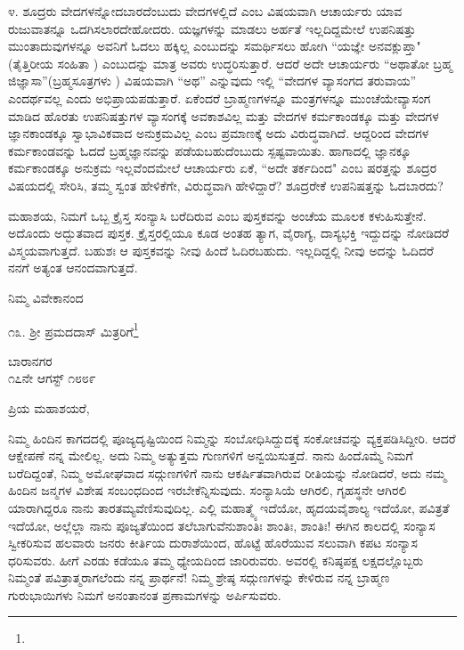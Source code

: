 ೪. ಶೂದ್ರರು ವೇದಗಳನ್ನೋದಬಾರದೆಂಬುದು ವೇದಗಳಲ್ಲಿದೆ ಎಂಬ ವಿಷಯವಾಗಿ ಆಚಾರ್ಯರು ಯಾವ ರುಜುವಾತನ್ನೂ ಒದಗಿಸಲಾರದೇಹೋದರು. ಯಜ್ಞಗಳನ್ನು ಮಾಡಲು ಅರ್ಹತೆ ಇಲ್ಲದಿದ್ದಮೇಲೆ ಉಪನಿಷತ್ತು ಮುಂತಾದುವುಗಳನ್ನೂ ಅವನಿಗೆ ಓದಲು ಹಕ್ಕಿಲ್ಲ ಎಂಬುದನ್ನು ಸಮರ್ಥಿಸಲು ಹೋಗಿ ``ಯಜ್ಞೇ ಅನವಕ್ಲುಪ್ತಾ" (ತೈತ್ತಿರೀಯ ಸಂಹಿತಾ ) ಎಂಬುದನ್ನು ಮಾತ್ರ ಅವರು ಉದ್ಧರಿಸುತ್ತಾರೆ. ಆದರೆ ಅದೇ ಆಚಾರ್ಯರು “ಅಥಾತೋ ಬ್ರಹ್ಮ ಜಿಜ್ಞಾಸಾ”(ಬ್ರಹ್ಮಸೂತ್ರಗಳು ) ವಿಷಯವಾಗಿ “ಅಥ” ಎನ್ನುವುದು ಇಲ್ಲಿ “ವೇದಗಳ ವ್ಯಾಸಂಗದ ತರುವಾಯ” ಎಂದರ್ಥವಲ್ಲ ಎಂದು ಅಭಿಪ್ರಾಯಪಡುತ್ತಾರೆ. ಏಕೆಂದರೆ ಬ್ರಾಹ್ಮಣಗಳನ್ನೂ ಮಂತ್ರಗಳನ್ನೂ ಮುಂಚೆಯೇ\break ವ್ಯಾಸಂಗ ಮಾಡಿದ ಹೊರತು ಉಪನಿಷತ್ತುಗಳ ವ್ಯಾಸಂಗಕ್ಕೆ ಅವಕಾಶವಿಲ್ಲ ಮತ್ತು ವೇದಗಳ ಕರ್ಮಕಾಂಡಕ್ಕೂ ಮತ್ತು ವೇದಗಳ ಜ್ಞಾನಕಾಂಡಕ್ಕೂ ಸ್ವಾಭಾವಿಕವಾದ ಅನುಕ್ರಮವಿಲ್ಲ ಎಂಬ ಪ್ರಮಾಣಕ್ಕೆ ಅದು ವಿರುದ್ಧವಾಗಿದೆ. ಆದ್ದರಿಂದ ವೇದಗಳ ಕರ್ಮಕಾಂಡವನ್ನು ಓದದೆ ಬ್ರಹ್ಮಜ್ಞಾನವನ್ನು ಪಡೆಯಬಹುದೆಂಬುದು ಸ್ಪಷ್ಟವಾಯಿತು. ಹಾಗಾದಲ್ಲಿ ಜ್ಞಾನಕ್ಕೂ ಕರ್ಮಕಾಂಡಕ್ಕೂ ಅನುಕ್ರಮ ಇಲ್ಲವೆಂದಮೇಲೆ ಆಚಾರ್ಯರು ಏಕೆ, “ಅದೇ ತರ್ಕದಿಂದ" ಎಂಬ ಷರತ್ತನ್ನು ಶೂದ್ರರ ವಿಷಯದಲ್ಲಿ ಸೇರಿಸಿ, ತಮ್ಮ ಸ್ವಂತ ಹೇಳಿಕೆಗೇ, ವಿರುದ್ಧವಾಗಿ ಹೇಳಿದ್ದಾರೆ? ಶೂದ್ರರೇಕೆ ಉಪನಿಷತ್ತನ್ನು ಓದಬಾರದು?

ಮಹಾಶಯ, ನಿಮಗೆ ಒಬ್ಬ ಕ್ರೈಸ್ತ ಸಂನ್ಯಾಸಿ ಬರೆದಿರುವ  ಎಂಬ ಪುಸ್ತಕವನ್ನು ಅಂಚೆಯ ಮೂಲಕ ಕಳುಹಿಸುತ್ತೇನೆ. ಅದೊಂದು ಅದ್ಭುತವಾದ ಪುಸ್ತಕ. ಕ್ರೈಸ್ತರಲ್ಲಿಯೂ ಕೂಡ ಅಂತಹ ತ್ಯಾಗ, ವೈರಾಗ್ಯ, ದಾಸ್ಯಭಕ್ತಿ ಇದ್ದುದನ್ನು ನೋಡಿದರೆ ವಿಸ್ಮಯವಾಗುತ್ತದೆ. ಬಹುಶಃ ಆ ಪುಸ್ತಕವನ್ನು ನೀವು ಹಿಂದೆ ಓದಿರಬಹುದು. ಇಲ್ಲದಿದ್ದಲ್ಲಿ ನೀವು ಅದನ್ನು ಓದಿದರೆ ನನಗೆ ಅತ್ಯಂತ ಆನಂದವಾಗುತ್ತದೆ.

{\flushright
ನಿಮ್ಮ ವಿವೇಕಾನಂದ\par}

\vspace{-0.3cm}

\begin{center}
೧೩. ಶ‍್ರೀ ಪ್ರಮದದಾಸ್ ಮಿತ್ರರಿಗೆ\footnote{}
\end{center}

\vspace{-0.7cm}

\begin{flushright}
ಬಾರಾನಗರ\\೧೭ನೇ ಆಗಸ್ಟ್ ೧೮೮೯
\end{flushright}

\noindent
ಪ್ರಿಯ ಮಹಾಶಯರೆ,

ನಿಮ್ಮ ಹಿಂದಿನ ಕಾಗದದಲ್ಲಿ ಪೂಜ್ಯದೃಷ್ಟಿಯಿಂದ ನಿಮ್ಮನ್ನು ಸಂಬೋಧಿಸಿದ್ದುದಕ್ಕೆ ಸಂಕೋಚವನ್ನು ವ್ಯಕ್ತಪಡಿಸಿದ್ದೀರಿ. ಆದರೆ ಆಕ್ಷೇಪಣೆ ನನ್ನ ಮೇಲಿಲ್ಲ. ಅದು ನಿಮ್ಮ ಅತ್ಯುತ್ತಮ ಗುಣಗಳಿಗೆ ಅನ್ವಯಿಸುತ್ತದೆ. ನಾನು ಹಿಂದೊಮ್ಮೆ ನಿಮಗೆ ಬರೆದಿದ್ದಂತೆ, ನಿಮ್ಮ ಅಮೋಘವಾದ ಸದ್ಗುಣಗಳಿಗೆ ನಾನು ಆಕರ್ಷಿತವಾಗಿರುವ ರೀತಿಯನ್ನು ನೋಡಿದರೆ, ಅದು ನಮ್ಮ ಹಿಂದಿನ ಜನ್ಮಗಳ ವಿಶೇಷ ಸಂಬಂಧದಿಂದ ಇರಬೇಕೆನ್ನಿಸುವುದು. ಸಂನ್ಯಾಸಿಯೆ ಆಗಿರಲಿ, ಗೃಹಸ್ಥನೇ ಆಗಿರಲಿ ಯಾರಾಗಿದ್ದರೂ ನಾನು ತಾರತಮ್ಯವೆಣಿಸುವುದಿಲ್ಲ. ಎಲ್ಲಿ ಮಹಾತ್ಮ್ಯೆ ಇದೆಯೋ, ಹೃದಯವೈಶಾಲ್ಯ ಇದೆಯೋ, ಪವಿತ್ರತೆ ಇದೆಯೋ, ಅಲ್ಲೆಲ್ಲಾ ನಾನು ಪೂಜ್ಯತೆಯಿಂದ ತಲೆಬಾಗುವೆನು\enginline{-}ಶಾಂತಿಃ ಶಾಂತಿಃ, ಶಾಂತಿಃ! ಈಗಿನ ಕಾಲದಲ್ಲಿ ಸಂನ್ಯಾಸ ಸ್ವೀಕರಿಸುವ ಹಲವಾರು ಜನರು ಕೀರ್ತಿಯ ದುರಾಶೆಯಿಂದ, ಹೊಟ್ಟೆ \break  ಹೊರೆಯುವ ಸಲುವಾಗಿ ಕಪಟ ಸಂನ್ಯಾಸ ಧರಿಸುವರು. ಹೀಗೆ ಎರಡು ಕಡೆಯೂ ತಮ್ಮ ಧ್ಯೇಯದಿಂದ ಜಾರಿರುವರು. ಅವರಲ್ಲಿ ಕನಿಷ್ಠಪಕ್ಷ ಲಕ್ಷದಲ್ಲೊಬ್ಬರು ನಿಮ್ಮಂತೆ ಪವಿತ್ರಾತ್ಮರಾಗಲೆಂದು ನನ್ನ ಪ್ರಾರ್ಥನೆ! ನಿಮ್ಮ ಶ್ರೇಷ್ಠ ಸದ್ಗುಣಗಳನ್ನು ಕೇಳಿರುವ ನನ್ನ ಬ್ರಾಹ್ಮಣ ಗುರುಭಾಯಿಗಳು ನಿಮಗೆ ಅನಂತಾನಂತ ಪ್ರಣಾಮಗಳನ್ನು ಅರ್ಪಿಸುವರು.

